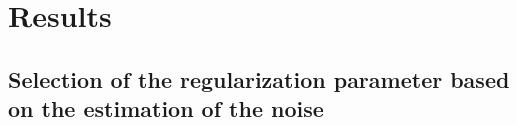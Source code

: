 \section{Results}


\subsection{Selection of the regularization parameter based on the estimation of the noise}

